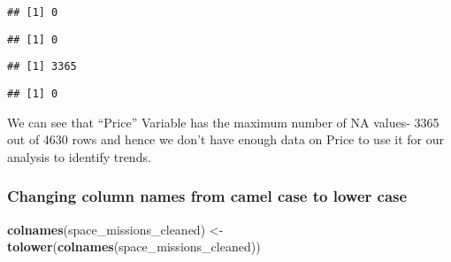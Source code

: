 \documentclass[
]{article}
\newenvironment{Shaded}{\begin{snugshade}}{\end{snugshade}}
\newcommand{\FunctionTok}[1]{\textcolor[rgb]{0.13,0.29,0.53}{\textbf{#1}}}
\newcommand{\NormalTok}[1]{#1}
\newcommand{\OtherTok}[1]{\textcolor[rgb]{0.56,0.35,0.01}{#1}}
\newcommand{\SpecialCharTok}[1]{\textcolor[rgb]{0.81,0.36,0.00}{\textbf{#1}}}
\begin{document}
\begin{verbatim}
## [1] 0
\end{verbatim}

\begin{Shaded}
\end{Shaded}

\begin{verbatim}
## [1] 0
\end{verbatim}

\begin{Shaded}
\end{Shaded}

\begin{verbatim}
## [1] 3365
\end{verbatim}

\begin{Shaded}
\end{Shaded}

\begin{verbatim}
## [1] 0
\end{verbatim}

We can see that ``Price'' Variable has the maximum number of NA values-
3365 out of 4630 rows and hence we don't have enough data on Price to
use it for our analysis to identify trends.

\hypertarget{changing-column-names-from-camel-case-to-lower-case}{%
\subsubsection{Changing column names from camel case to lower
case}\label{changing-column-names-from-camel-case-to-lower-case}}

\begin{Shaded}
\begin{Highlighting}[]
\FunctionTok{colnames}\NormalTok{(space\_missions\_cleaned) }\OtherTok{\textless{}{-}} \FunctionTok{tolower}\NormalTok{(}\FunctionTok{colnames}\NormalTok{(space\_missions\_cleaned))}
\end{Highlighting}
\end{Shaded}
\end{document}
